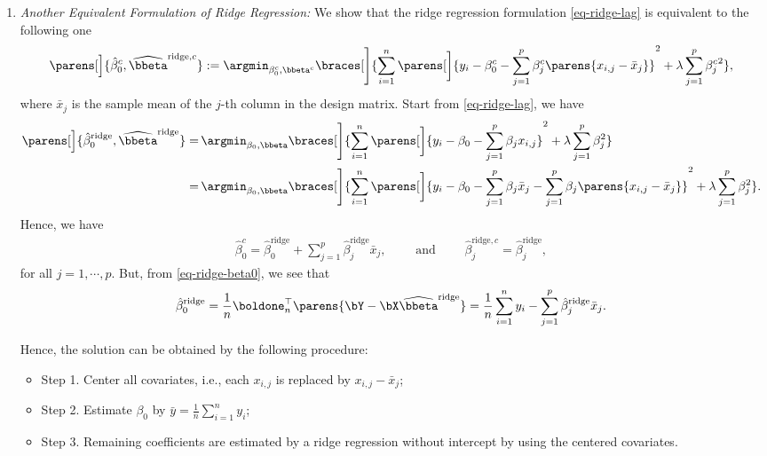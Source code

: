 \documentclass[12pt]{article}
\begin{document}
\begin{enumerate}[label=\textbf{\arabic*.}]
\begin{enumerate}
		\item \textit{Another Equivalent Formulation of Ridge Regression:} We show that the ridge regression formulation \eqref{eq-ridge-lag} is equivalent to the following one 
		\begin{align*}
			\parens[\Big]{\hat{\beta}_0^c, \widehat{\bbeta}^{\mathrm{ridge}, c}} := \argmin_{\beta^c_0, \bbeta^c} \braces[\Bigg]{\sum_{i=1}^n \parens[\bigg]{y_i - \beta_0^c - \sum_{j=1}^p \beta_j^c \parens{x_{i,j} - \bar{x}_j}}^2 + \lambda \sum_{j=1}^p {\beta_j^c}^2}, 
		\end{align*}
		where $\bar{x}_j$ is the sample mean of the $j$-th column in the design matrix. Start from \eqref{eq-ridge-lag}, we have 
		\begin{align*}
			\parens[\Big]{\hat{\beta}_0^{\mathrm{ridge}}, \widehat{\bbeta}^{\mathrm{ridge}}} = & \, \argmin_{\beta_0, \bbeta} \braces[\Bigg]{\sum_{i=1}^n \parens[\bigg]{y_i - \beta_0 - \sum_{j=1}^p \beta_j x_{i,j}}^2 + \lambda \sum_{j=1}^p \beta_j^2} \\ 
			= & \, \argmin_{\beta_0, \bbeta} \braces[\Bigg]{\sum_{i=1}^n \parens[\bigg]{y_i - \beta_0 - \sum_{j=1}^p \beta_j \bar{x}_j - \sum_{j=1}^p \beta_j \parens{x_{i,j} - \bar{x}_j}}^2 + \lambda \sum_{j=1}^p \beta_j^2}.  
		\end{align*}
		Hence, we have 
		\begin{align*}
			\hat{\beta}_{0}^{c} = \hat{\beta}_{0}^{\mathrm{ridge}} + \sum_{j=1}^p \hat{\beta}_{j}^{\mathrm{ridge}} \bar{x}_j, \qquad \text{ and } \qquad \hat{\beta}_{j}^{\mathrm{ridge}, c} = \hat{\beta}_{j}^{\mathrm{ridge}}, 
		\end{align*}
		for all $j = 1, \cdots, p$. But, from \eqref{eq-ridge-beta0}, we see that 
		\begin{align*}
			\hat{\beta}_{0}^{\mathrm{ridge}} = \frac{1}{n} \boldone_n^\top \parens{\bY - \bX \widehat{\bbeta}^{\mathrm{ridge}}} = \frac{1}{n} \sum_{i=1}^n y_i - \sum_{j=1}^p \hat{\beta}_{j}^{\mathrm{ridge}} \bar{x}_j. 
		\end{align*}
		
		Hence, the solution can be obtained by the following procedure: 
		\begin{itemize}
			\item[] Step 1. Center all covariates, i.e., each $x_{i,j}$ is replaced by $x_{i,j} - \bar{x}_{j}$; 
			\item[] Step 2. Estimate $\beta_0$ by $\bar{y} = \frac{1}{n} \sum_{i=1}^n y_i$; 
			\item[] Step 3. Remaining coefficients are estimated by a ridge regression without intercept by using the centered covariates. 
		\end{itemize}
		

\end{enumerate}
\end{enumerate}
\end{document}
